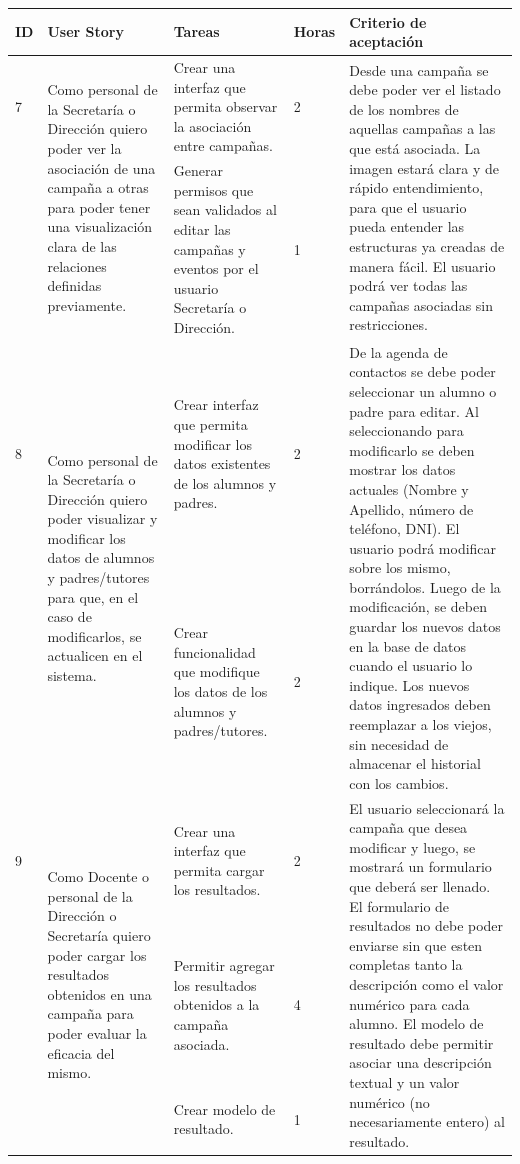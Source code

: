 \documentclass[a4paper, 11pt]{article}
\begin{document}
\begin{table}[H]
\centering
\begin{tabular}{ | p{0.5cm} | p{4cm} | p{5cm} | p{0.85cm} | p{5cm} |}
\hline 
ID & User Story & Tareas & Horas & Criterio de aceptación \\ \hline \hline


7 & \multirow{2}{4cm}{Como personal de la Secretaría o Dirección quiero poder ver la asociación de una campaña a otras para poder tener una visualización clara de las relaciones definidas previamente.} & Crear una interfaz que permita observar la asociación entre campañas. & 2 & \multirow{2}{5cm}{Desde una campaña se debe poder ver el listado de los nombres de aquellas campañas a las que está asociada. La imagen estará clara y de rápido entendimiento, para que el usuario pueda entender las estructuras ya creadas de manera fácil. El usuario podrá ver todas las campañas asociadas sin restricciones.} \\[2cm] \cline{3-4}
& & Generar permisos que sean validados al editar las campañas y eventos por el usuario Secretaría o Dirección. & 1 & \\[3cm] \hline


8 & \multirow{2}{4cm}{Como personal de la Secretaría o Dirección quiero poder visualizar y modificar los datos de alumnos y padres/tutores para que, en el caso de modificarlos, se actualicen en el sistema.} & Crear interfaz que permita modificar los datos existentes de los alumnos y padres. & 2 & \multirow{2}{5cm}{De la agenda de contactos se debe poder seleccionar un alumno o padre para editar. Al seleccionando para modificarlo se deben mostrar los datos actuales (Nombre y Apellido, número de teléfono, DNI). El usuario podrá modificar sobre los mismo, borrándolos.  Luego de la modificación, se deben guardar los nuevos datos en la base de datos cuando el usuario lo indique. Los nuevos datos ingresados deben reemplazar a los viejos, sin necesidad de almacenar el historial con los cambios. } \\[4cm] \cline{3-4}
& & Crear funcionalidad que modifique los datos de los alumnos y padres/tutores. & 2 &  \\[4cm] \hline


9 & \multirow{3}{4cm}{Como Docente o personal de la Dirección o Secretaría quiero poder cargar los resultados obtenidos en una campaña para poder evaluar la eficacia del mismo.} & Crear una interfaz que permita cargar los resultados. & 2 & \multirow{3}{5cm}{El usuario seleccionará la campaña que desea modificar y luego, se mostrará un formulario que deberá ser llenado. El formulario de resultados no debe poder enviarse sin que esten completas tanto la descripción como el valor numérico para cada alumno. El modelo de resultado debe permitir asociar una descripción textual y un valor numérico (no necesariamente entero) al resultado.} \\[2cm] \cline{3-4}
& & Permitir agregar los resultados obtenidos a la campaña asociada. & 4 & \\[2cm] \cline{3-4}
& & Crear modelo de resultado. & 1 & \\[2cm] \hline


\end{tabular}
\end{table}
\end{document}
